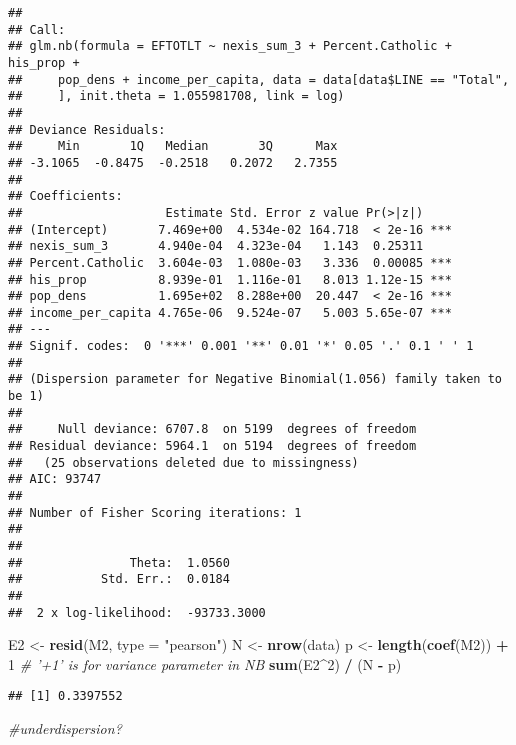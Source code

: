 \documentclass[]{article}
\newenvironment{Shaded}{\begin{snugshade}}{\end{snugshade}}
\newcommand{\KeywordTok}[1]{\textcolor[rgb]{0.13,0.29,0.53}{\textbf{#1}}}
\newcommand{\DataTypeTok}[1]{\textcolor[rgb]{0.13,0.29,0.53}{#1}}
\newcommand{\DecValTok}[1]{\textcolor[rgb]{0.00,0.00,0.81}{#1}}
\newcommand{\StringTok}[1]{\textcolor[rgb]{0.31,0.60,0.02}{#1}}
\newcommand{\CommentTok}[1]{\textcolor[rgb]{0.56,0.35,0.01}{\textit{#1}}}
\newcommand{\OperatorTok}[1]{\textcolor[rgb]{0.81,0.36,0.00}{\textbf{#1}}}
\newcommand{\NormalTok}[1]{#1}
\begin{document}
\begin{verbatim}
## 
## Call:
## glm.nb(formula = EFTOTLT ~ nexis_sum_3 + Percent.Catholic + his_prop + 
##     pop_dens + income_per_capita, data = data[data$LINE == "Total", 
##     ], init.theta = 1.055981708, link = log)
## 
## Deviance Residuals: 
##     Min       1Q   Median       3Q      Max  
## -3.1065  -0.8475  -0.2518   0.2072   2.7355  
## 
## Coefficients:
##                    Estimate Std. Error z value Pr(>|z|)    
## (Intercept)       7.469e+00  4.534e-02 164.718  < 2e-16 ***
## nexis_sum_3       4.940e-04  4.323e-04   1.143  0.25311    
## Percent.Catholic  3.604e-03  1.080e-03   3.336  0.00085 ***
## his_prop          8.939e-01  1.116e-01   8.013 1.12e-15 ***
## pop_dens          1.695e+02  8.288e+00  20.447  < 2e-16 ***
## income_per_capita 4.765e-06  9.524e-07   5.003 5.65e-07 ***
## ---
## Signif. codes:  0 '***' 0.001 '**' 0.01 '*' 0.05 '.' 0.1 ' ' 1
## 
## (Dispersion parameter for Negative Binomial(1.056) family taken to be 1)
## 
##     Null deviance: 6707.8  on 5199  degrees of freedom
## Residual deviance: 5964.1  on 5194  degrees of freedom
##   (25 observations deleted due to missingness)
## AIC: 93747
## 
## Number of Fisher Scoring iterations: 1
## 
## 
##               Theta:  1.0560 
##           Std. Err.:  0.0184 
## 
##  2 x log-likelihood:  -93733.3000
\end{verbatim}

\begin{Shaded}
\begin{Highlighting}[]
\NormalTok{E2 <-}\StringTok{ }\KeywordTok{resid}\NormalTok{(M2, }\DataTypeTok{type =} \StringTok{"pearson"}\NormalTok{)}
\NormalTok{N  <-}\StringTok{ }\KeywordTok{nrow}\NormalTok{(data)}
\NormalTok{p  <-}\StringTok{ }\KeywordTok{length}\NormalTok{(}\KeywordTok{coef}\NormalTok{(M2)) }\OperatorTok{+}\StringTok{ }\DecValTok{1}  \CommentTok{# '+1' is for variance parameter in NB}
\KeywordTok{sum}\NormalTok{(E2}\OperatorTok{^}\DecValTok{2}\NormalTok{) }\OperatorTok{/}\StringTok{ }\NormalTok{(N }\OperatorTok{-}\StringTok{ }\NormalTok{p)}
\end{Highlighting}
\end{Shaded}

\begin{verbatim}
## [1] 0.3397552
\end{verbatim}

\begin{Shaded}
\begin{Highlighting}[]
\CommentTok{#underdispersion?}
\end{Highlighting}
\end{Shaded}

\begin{Shaded}
\end{Shaded}
\end{document}
